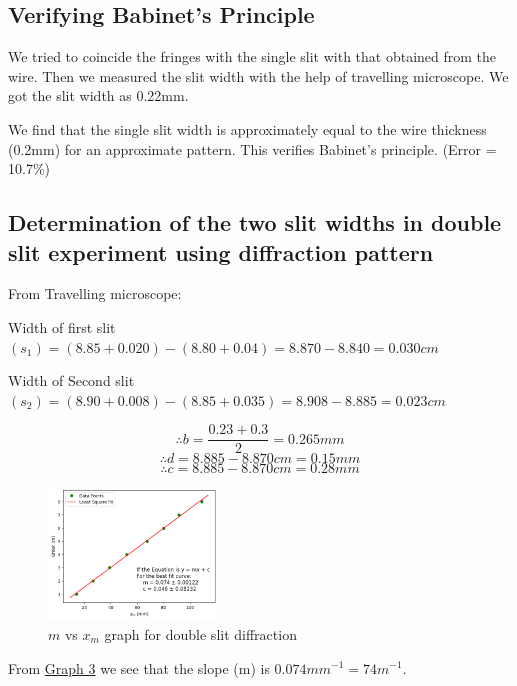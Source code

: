     \subsection{Verifying Babinet's Principle}
        We tried to coincide the fringes with the single slit with that obtained from the wire. Then we measured the slit width with the help of travelling microscope. We got the slit width as 0.22mm. 

        We find that the single slit width is approximately equal to the wire thickness (0.2mm) for an approximate pattern. This verifies Babinet's principle. (Error = 10.7\%)
    
    \subsection{Determination of the two slit widths in double slit experiment using diffraction pattern}

        From Travelling microscope:
        
        Width of first slit $(s_1) = (8.85+0.020)-(8.80+0.04) = 8.870-8.840 = 0.030cm$
        
        Width of Second slit $(s_2) = (8.90+0.008)-(8.85+0.035) = 8.908-8.885 = 0.023cm$

        $$\therefore b = \frac{0.23+0.3}{2} = 0.265mm$$
        $$\therefore d = 8.885-8.870 cm = 0.15mm$$
        $$\therefore c = 8.885-8.870 cm = 0.28mm$$

        

        \begin{figure}[H]
            \centering
            \includegraphics[width=0.4\textwidth]{images/graph_3.png}
            \caption{$m$ vs $x_m$ graph for double slit diffraction}
            \label{graph:3}
        \end{figure}

        From \hyperref[graph:3]{Graph 3} we see that the slope (m) is $0.074 mm^{-1} = 74 m^{-1}$.

